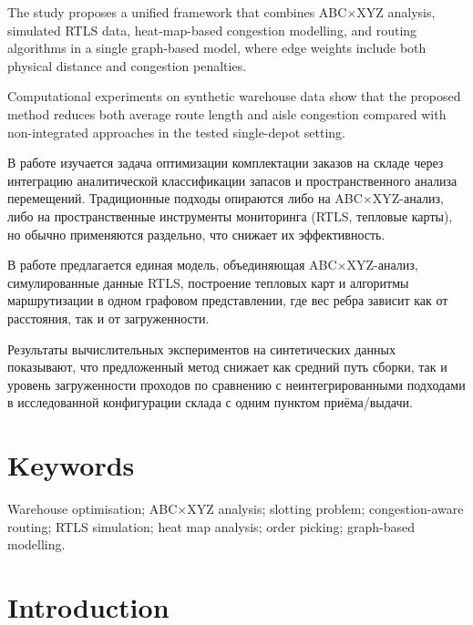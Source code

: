 \documentclass[12pt,a4paper]{article}
\begin{document}
The study proposes a unified framework that combines ABC$\times$XYZ analysis,
simulated RTLS data, heat-map-based congestion modelling, and routing algorithms
in a single graph-based model, where edge weights include both physical distance
and congestion penalties.

Computational experiments on synthetic warehouse data show that the proposed
method reduces both average route length and aisle congestion compared with
non-integrated approaches in the tested single-depot setting.

\bigskip

В работе изучается задача оптимизации комплектации заказов на складе через
интеграцию аналитической классификации запасов и пространственного анализа
перемещений. Традиционные подходы опираются либо на ABC$\times$XYZ-анализ, либо
на пространственные инструменты мониторинга (RTLS, тепловые карты), но обычно
применяются раздельно, что снижает их эффективность.

В работе предлагается единая модель, объединяющая ABC$\times$XYZ-анализ,
симулированные данные RTLS, построение тепловых карт и алгоритмы маршрутизации
в одном графовом представлении, где вес ребра зависит как от расстояния, так
и от загруженности.

Результаты вычислительных экспериментов на синтетических данных показывают,
что предложенный метод снижает как средний путь сборки, так и уровень
загруженности проходов по сравнению с неинтегрированными подходами в
исследованной конфигурации склада с одним пунктом приёма/выдачи.

\section*{Keywords}

Warehouse optimisation; ABC$\times$XYZ analysis; slotting problem; congestion-aware
routing; RTLS simulation; heat map analysis; order picking; graph-based modelling.

\newpage
\section{Introduction}
\end{document}
